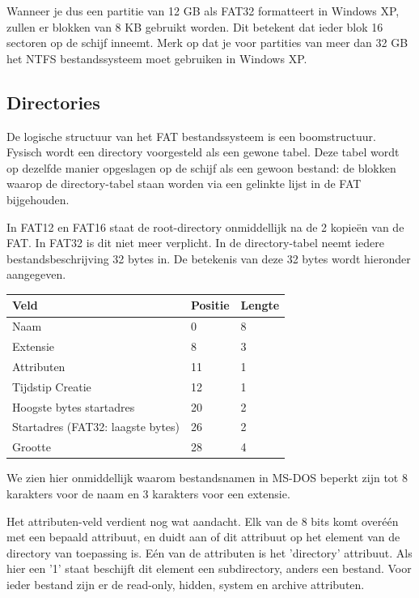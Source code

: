 Wanneer je dus een partitie van 12 GB als FAT32 formatteert in
Windows XP, zullen er blokken van 8 KB gebruikt worden. Dit betekent
dat ieder blok 16 sectoren op de schijf inneemt. Merk op dat je voor
partities van meer dan 32 GB het NTFS bestandssysteem moet gebruiken
in Windows XP.

\subsection{Directories}

De logische structuur van het FAT bestandssysteem is een
boomstructuur. Fysisch wordt een directory voorgesteld als een gewone
tabel. Deze tabel wordt op dezelfde manier opgeslagen op de schijf als
een gewoon bestand: de blokken waarop de directory-tabel staan worden
via een gelinkte lijst in de FAT bijgehouden.

In FAT12 en FAT16 staat de root-directory onmiddellijk na de 2
kopie\"en van de FAT. In FAT32 is dit niet meer verplicht. In de
directory-tabel neemt iedere bestandsbeschrijving 32 bytes in. De
betekenis van deze 32 bytes wordt hieronder aangegeven.

\begin{center}
\begin{tabular}{|l|l|l|}
\hline
Veld                              & Positie & Lengte \\
\hline
Naam                              & 0       & 8      \\
Extensie                          & 8       & 3      \\
Attributen                        & 11      & 1      \\
Tijdstip Creatie                  & 12      & 1      \\
Hoogste bytes startadres          & 20      & 2      \\
Startadres (FAT32: laagste bytes) & 26      & 2      \\
Grootte                           & 28      & 4      \\
\hline
\end{tabular}
\end{center}

We zien hier onmiddellijk waarom bestandsnamen in MS-DOS beperkt
zijn tot 8 karakters voor de naam en 3 karakters voor een
extensie.

Het attributen-veld verdient nog wat aandacht. Elk van de 8 bits
komt over\'e\'en met een bepaald attribuut, en duidt aan of dit attribuut
op het element van de directory van toepassing is. E\'en van de
attributen is het 'directory' attribuut. Als hier een '1' staat
beschijft dit element een subdirectory, anders een bestand. Voor ieder
bestand zijn er de read-only, hidden, system en archive
attributen.

